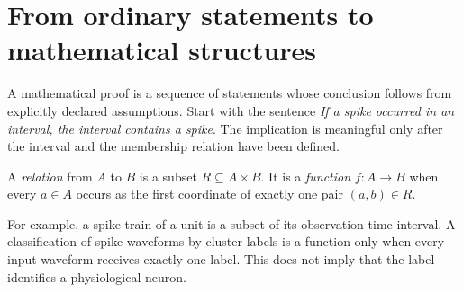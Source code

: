 \chapter[Statements and mathematical structures]{From ordinary statements to mathematical structures}
A mathematical proof is a sequence of statements whose conclusion follows
from explicitly declared assumptions. Start with the sentence
\emph{If a spike occurred in an interval, the interval contains a spike}.
The implication is meaningful only after the interval and the membership
relation have been defined.

\begin{definition}
A \emph{relation} from $A$ to $B$ is a subset $R\subseteq A\times B$.
It is a \emph{function} $f:A\to B$ when every $a\in A$ occurs as
the first coordinate of exactly one pair $(a,b)\in R$.
\end{definition}
For example, a spike train of a unit is a subset of its observation
time interval. A classification of spike waveforms by cluster labels is
a function only when every input waveform receives exactly one label.
This does not imply that the label identifies a physiological neuron.

